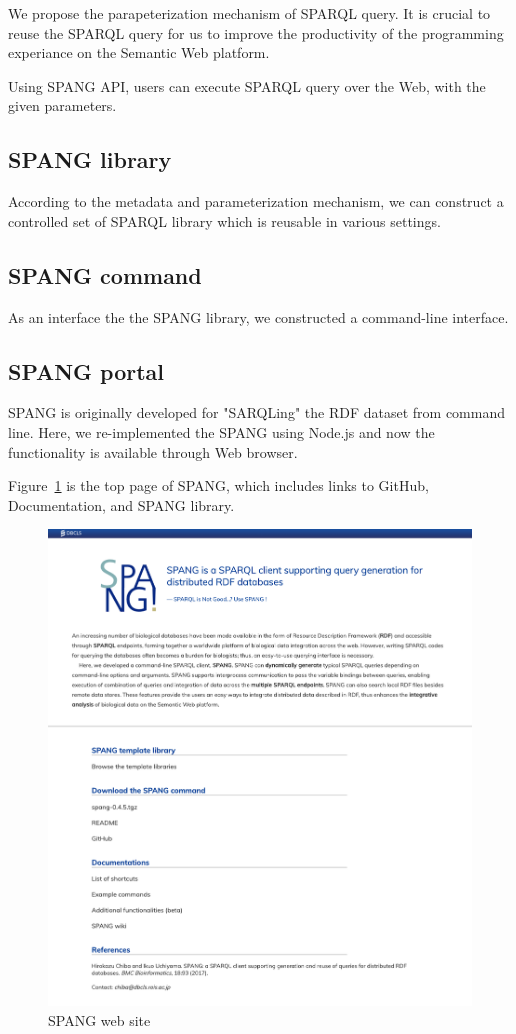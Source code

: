 \documentclass[runningheads]{llncs}
\begin{document}
We propose the parapeterization mechanism of SPARQL query. It is crucial to reuse the SPARQL query for us to improve the productivity of the programming experiance on the Semantic Web platform.

Using SPANG API, users can execute SPARQL query over the Web, with the given parameters.

\subsection{SPANG library}

According to the metadata and parameterization mechanism, we can construct a controlled set of SPARQL library which is reusable in various settings.

\subsection{SPANG command}

As an interface the the SPANG library, we constructed a command-line interface.

\subsection{SPANG portal}
SPANG is originally developed for "SARQLing" the RDF dataset from command line. Here, we re-implemented the SPANG using Node.js and now the functionality is available through Web browser. 

Figure~\ref{fig:spang_top} is the top page of SPANG, which includes links to GitHub, Documentation, and SPANG library.

\begin{figure}
\center
\includegraphics[width=1.0\textwidth]{spang_top.png}
\caption{SPANG web site}
\label{fig:spang_top}
\end{figure}
\end{document}

